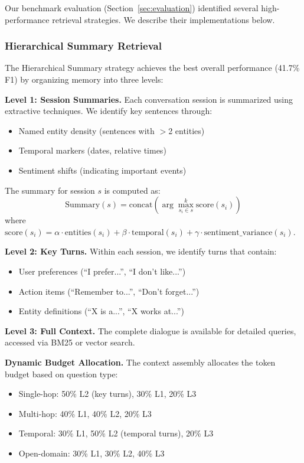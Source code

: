 Our benchmark evaluation (Section~\ref{sec:evaluation}) identified several high-performance retrieval strategies. We describe their implementations below.

\subsubsection{Hierarchical Summary Retrieval}

The Hierarchical Summary strategy achieves the best overall performance (41.7\% F1) by organizing memory into three levels:

\textbf{Level 1: Session Summaries.} Each conversation session is summarized using extractive techniques. We identify key sentences through:
\begin{itemize}
    \item Named entity density (sentences with $>$2 entities)
    \item Temporal markers (dates, relative times)
    \item Sentiment shifts (indicating important events)
\end{itemize}

The summary for session $s$ is computed as:
\begin{equation}
\text{Summary}(s) = \text{concat}\left(\arg\max_{s_i \in s}^{k} \text{score}(s_i)\right)
\end{equation}
where $\text{score}(s_i) = \alpha \cdot \text{entities}(s_i) + \beta \cdot \text{temporal}(s_i) + \gamma \cdot \text{sentiment\_variance}(s_i)$.

\textbf{Level 2: Key Turns.} Within each session, we identify turns that contain:
\begin{itemize}
    \item User preferences (``I prefer...'', ``I don't like...'')
    \item Action items (``Remember to...'', ``Don't forget...'')
    \item Entity definitions (``X is a...'', ``X works at...'')
\end{itemize}

\textbf{Level 3: Full Context.} The complete dialogue is available for detailed queries, accessed via BM25 or vector search.

\textbf{Dynamic Budget Allocation.} The context assembly allocates the token budget based on question type:
\begin{itemize}
    \item Single-hop: 50\% L2 (key turns), 30\% L1, 20\% L3
    \item Multi-hop: 40\% L1, 40\% L2, 20\% L3
    \item Temporal: 30\% L1, 50\% L2 (temporal turns), 20\% L3
    \item Open-domain: 30\% L1, 30\% L2, 40\% L3
\end{itemize}

